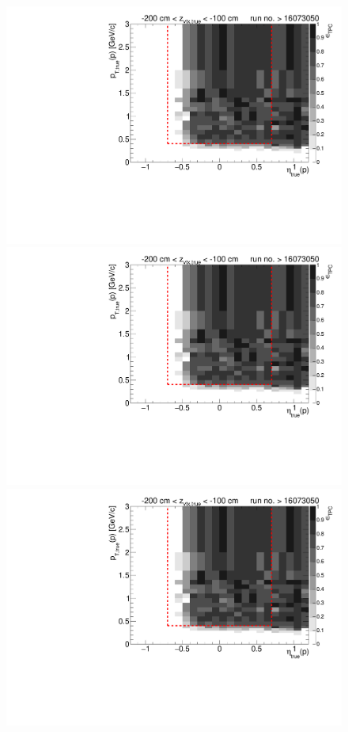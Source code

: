 \begin{figure}[hb]\ContinuedFloat
	\centering
	\parbox{0.495\textwidth}{
		\centering
		\includegraphics[width=\linewidth,page=11]{graphics/eff/Eff2D_TPC_proton_Plus_RunRange2.pdf}\\
		\includegraphics[width=\linewidth,page=13]{graphics/eff/Eff2D_TPC_proton_Plus_RunRange2.pdf}\\
		\includegraphics[width=\linewidth,page=15]{graphics/eff/Eff2D_TPC_proton_Plus_RunRange2.pdf}\\
}
\end{figure}
